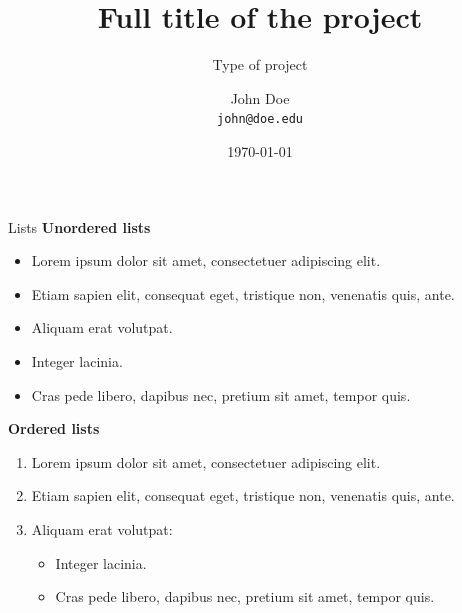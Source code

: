 \documentclass[aspectratio=1610]{beamer}
\title[Short title]
{Full title of the project}
\subtitle
{Type of project}
\author[John Doe]
{John Doe \\
\texttt{john@doe.edu}}
\institute
{Department of Radio Electronics \\
Brno University of Technology
}
\date{\today}
\begin{document}

\begin{frame}
    \titlepage
\end{frame}

\begin{frame}{Lists}
    \textbf{Unordered lists}
    \begin{itemize}
        \item Lorem ipsum dolor sit amet, consectetuer adipiscing elit.
        \item Etiam sapien elit, consequat eget, tristique non, venenatis quis, ante.
        \item Aliquam erat volutpat.
        \item Integer lacinia.
        \item Cras pede libero, dapibus nec, pretium sit amet, tempor quis.
    \end{itemize}
    \bigskip %

    \textbf{Ordered lists}
    \begin{enumerate}
        \item \alert{Lorem ipsum dolor} sit amet, consectetuer adipiscing elit.
        \item Etiam sapien elit, consequat eget, tristique non, venenatis quis, ante.
        \item Aliquam erat volutpat:
        \begin{itemize}
            \item Integer lacinia.
            \item Cras pede libero, dapibus nec, pretium sit amet, tempor quis.
        \end{itemize}
    \end{enumerate}
\end{frame}

\end{document}
